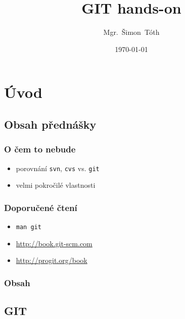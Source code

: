 \documentclass[pdftex]{beamer}
\title{GIT hands-on}
\author[]{Mgr.~Šimon~Tóth}
\date{\today}
\begin{document}

\begin{frame}
	\titlepage
\end{frame}

\section{Úvod}
\subsection*{Obsah přednášky}

\begin{frame}
\frametitle{O čem to nebude}
	\begin{itemize}
		\item	porovnání \texttt{svn}, \texttt{cvs} vs. \texttt{git}
		\item	velmi pokročilé vlastnosti
	\end{itemize}
\end{frame}

\begin{frame}
\frametitle{Doporučené čtení}
	\begin{itemize}
		\item	\texttt{man git}
		\item	\url{http://book.git-scm.com}
		\item	\url{http://progit.org/book}
	\end{itemize}
\end{frame}

\begin{frame}
\frametitle{Obsah}
	\tableofcontents
\end{frame}

\subsection{GIT}
\end{document}

